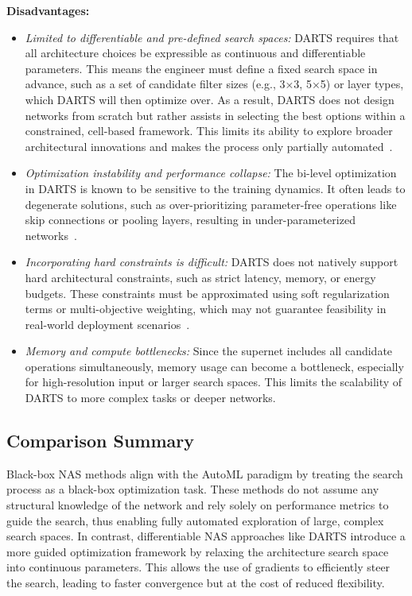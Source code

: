 \textbf{Disadvantages:}
\begin{itemize}
    \item \textit{Limited to differentiable and pre-defined search spaces:} DARTS requires that all architecture choices be expressible as continuous and differentiable parameters. This means the engineer must define a fixed search space in advance, such as a set of candidate filter sizes (e.g., 3×3, 5×5) or layer types, which DARTS will then optimize over. As a result, DARTS does not design networks from scratch but rather assists in selecting the best options within a constrained, cell-based framework. This limits its ability to explore broader architectural innovations and makes the process only partially automated~\cite{elsken2019neural}.

    
    \item \textit{Optimization instability and performance collapse:} The bi-level optimization in DARTS is known to be sensitive to the training dynamics. It often leads to degenerate solutions, such as over-prioritizing parameter-free operations like skip connections or pooling layers, resulting in under-parameterized networks~\cite{zela2020understanding}.
    
    \item \textit{Incorporating hard constraints is difficult:} DARTS does not natively support hard architectural constraints, such as strict latency, memory, or energy budgets. These constraints must be approximated using soft regularization terms or multi-objective weighting, which may not guarantee feasibility in real-world deployment scenarios~\cite{king2025micronas}.
    
    \item \textit{Memory and compute bottlenecks:} Since the supernet includes all candidate operations simultaneously, memory usage can become a bottleneck, especially for high-resolution input or larger search spaces. This limits the scalability of DARTS to more complex tasks or deeper networks.
\end{itemize}

\subsection{Comparison Summary}
Black-box NAS methods align with the AutoML paradigm by treating the search process as a black-box optimization task. These methods do not assume any structural knowledge of the network and rely solely on performance metrics to guide the search, thus enabling fully automated exploration of large, complex search spaces. In contrast, differentiable NAS approaches like DARTS introduce a more guided optimization framework by relaxing the architecture search space into continuous parameters. This allows the use of gradients to efficiently steer the search, leading to faster convergence but at the cost of reduced flexibility.







